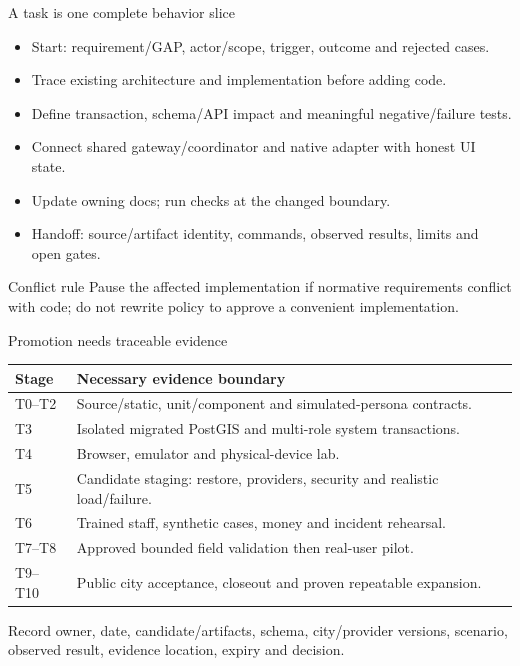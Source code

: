 \documentclass[aspectratio=169,10pt]{beamer}
\begin{document}
\begin{frame}{A task is one complete behavior slice}
\begin{itemize}
\item Start: requirement/GAP, actor/scope, trigger, outcome and rejected cases.
\item Trace existing architecture and implementation before adding code.
\item Define transaction, schema/API impact and meaningful negative/failure tests.
\item Connect shared gateway/coordinator and native adapter with honest UI state.
\item Update owning docs; run checks at the changed boundary.
\item Handoff: source/artifact identity, commands, observed results, limits and open gates.
\end{itemize}
\begin{block}{Conflict rule}
Pause the affected implementation if normative requirements conflict with code;
do not rewrite policy to approve a convenient implementation.
\end{block}
\end{frame}

\begin{frame}{Promotion needs traceable evidence}
\small
\begin{tabularx}{\textwidth}{@{}lX@{}}
\toprule Stage & Necessary evidence boundary \\\midrule
T0--T2 & Source/static, unit/component and simulated-persona contracts. \\
T3 & Isolated migrated PostGIS and multi-role system transactions. \\
T4 & Browser, emulator and physical-device lab. \\
T5 & Candidate staging: restore, providers, security and realistic load/failure. \\
T6 & Trained staff, synthetic cases, money and incident rehearsal. \\
T7--T8 & Approved bounded field validation then real-user pilot. \\
T9--T10 & Public city acceptance, closeout and proven repeatable expansion. \\
\bottomrule
\end{tabularx}
\vspace{3mm}Record owner, date, candidate/artifacts, schema, city/provider versions,
scenario, observed result, evidence location, expiry and decision.
\end{frame}
\end{document}
